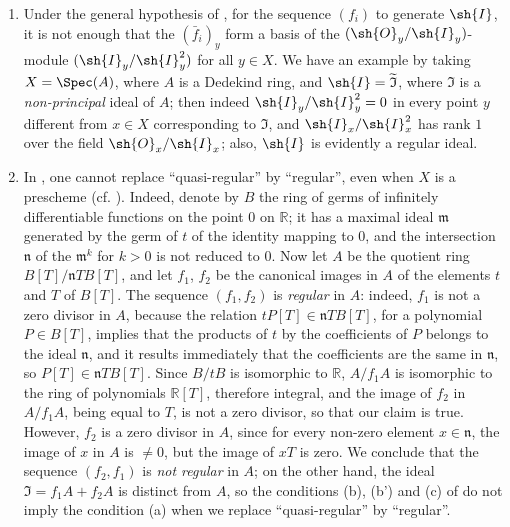 \begin{remarks}[16.9.6]
\label{IV.16.9.6}
\begin{enumerate}
  \item[\rm{(i)}] Under the general hypothesis of , for the sequence $(f_i)$ to generate $\sh{I}$, it is not enough that the $(\bar f_i)_y$ form a basis of the $(\sh{O}_y/\sh{I}_y)$-module $(\sh{I}_y/\sh{I}_y^2)$ for all $y \in X$.
  We have an example by 
  taking  $X = \Spec(A)$, where $A$ is a Dedekind ring, and $\sh{I} = \widetilde{\mathfrak{I}}$, where $\mathfrak{I}$ is a \emph{non-principal} ideal of $A$;
  then indeed $\sh{I}_y/\sh{I}_y^2 = 0$ in every point $y$ different from $x \in X$ corresponding to $\mathfrak{I}$, and $\sh{I}_x/\sh{I}_x^2$ has rank $1$ over the field $\sh{O}_x/\sh{I}_x$;
  also, $\sh{I}$ is evidently a regular ideal.

  \item[\rm{(ii)}] In , one cannot replace ``quasi-regular'' by ``regular'', even when $X$ is a prescheme (cf. ).
  Indeed, denote by $B$ the ring of germs of infinitely differentiable functions on the point $0$ on $\mathbb{R}$; 
  it has a maximal ideal $\mathfrak{m}$ generated by the germ of $t$ of the identity mapping to $0$, and the intersection $\mathfrak{n}$ of the $\mathfrak{m}^k$ for $k>0$ is not reduced to $0$.
  Now let $A$ be the quotient ring $B[T]/\mathfrak{n}TB[T]$, and let $f_1$, $f_2$ be the canonical images in $A$ of the elements $t$ and $T$ of $B[T]$.
  The sequence $(f_1, f_2)$ is \emph{regular} in $A$: indeed, $f_1$ is not a zero divisor in $A$, because the relation $tP[T] \in \mathfrak{n}TB[T]$, for a polynomial $P \in B[T]$, implies that the products of $t$ by the coefficients of $P$ belongs to the ideal $\mathfrak{n}$, and it results immediately that the coefficients are the same in $\mathfrak{n}$, so $P[T] \in \mathfrak{n}TB[T]$.
  Since $B/tB$ is isomorphic to $\mathbb{R}$, $A/f_1A$ is isomorphic to the ring of polynomials $\mathbb{R}[T]$, therefore integral, and the image of $f_2$ in $A/f_1A$, being equal to $T$, is not a zero divisor, so that our claim is true.
  However, $f_2$ is a zero divisor in $A$, since for every non-zero element $x \in \mathfrak{n}$, the image of $x$ in $A$ is $\neq 0$, but the image of $xT$ is zero.
  We conclude that the sequence $(f_2, f_1)$ is \emph{not regular} in $A$;
  on the other hand, the ideal $\mathfrak{I} = f_1A + f_2A$ is distinct from $A$, so the conditions (b), (b') and (c) of  do not imply the condition (a) when we replace ``quasi-regular'' by ``regular''.
\end{enumerate}
\end{remarks}

